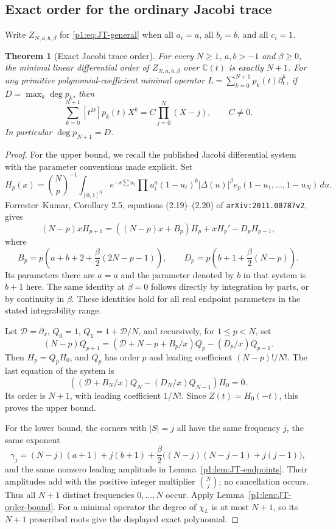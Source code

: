 \documentclass[11pt,a4paper]{article}
\newtheorem{theorem}{Theorem}[section]
\theoremstyle{definition}
\theoremstyle{remark}
\numberwithin{equation}{section}
\begin{document}
\subsection{Exact order for the ordinary Jacobi trace}

Write $Z_{N,a,b,\beta}$ for \eqref{p1:eq:JT-general} when all $a_i=a$,
all $b_i=b$, and all $c_i=1$.

\begin{theorem}[Exact Jacobi trace order]\label{p1:thm:JT-symmetric}
For every $N\ge1$, $a,b>-1$ and $\beta\ge0$, the minimal linear
differential order of $Z_{N,a,b,\beta}$ over $\mathbb C(t)$ is exactly
$N+1$.  For any primitive polynomial-coefficient minimal operator
$L=\sum_{k=0}^{N+1}p_k(t)\partial_t^k$, if
$D=\max_k\deg p_k$, then
\[
 \sum_{k=0}^{N+1}[t^D]p_k(t)X^k
       =C\prod_{j=0}^{N}(X-j),\qquad C\ne0.
\]
In particular $\deg p_{N+1}=D$.
\end{theorem}

\begin{proof}
For the upper bound, we recall the published Jacobi differential
system with the parameter conventions made explicit.  Set
\[
 H_p(x)=\binom Np^{-1}\int_{[0,1]^N}e^{-x\sum u_i}
  \prod u_i^a(1-u_i)^b |\Delta(u)|^\beta
  e_p(1-u_1,\ldots,1-u_N)\,du.
\]
Forrester--Kumar, Corollary 2.5, equations (2.19)--(2.20) of
\texttt{arXiv:2011.00787v2}, gives
\[
 (N-p)xH_{p+1}=((N-p)x+B_p)H_p+xH_p'-D_pH_{p-1},
\]
where
\[
 B_p=p\left(a+b+2+\frac\beta2(2N-p-1)\right),\qquad
 D_p=p\left(b+1+\frac\beta2(N-p)\right).
\]
Its parameters there are $a=a$ and the parameter denoted by $b$
in that system is $b+1$ here.  The same identity at $\beta=0$
follows directly by integration by parts, or by continuity in
$\beta$.  These identities hold for all real endpoint parameters
in the stated integrability range.

Let $\mathscr D=\partial_x$, $Q_0=1$, $Q_1=1+\mathscr D/N$, and
recursively, for $1\le p<N$, set
\[
 (N-p)Q_{p+1}
 =\left(\mathscr D+N-p+B_p/x\right)Q_p-(D_p/x)Q_{p-1}.
\]
Then $H_p=Q_pH_0$, and $Q_p$ has order $p$ and leading coefficient
$(N-p)!/N!$.  The last equation of the system is
\[
 \left((\mathscr D+B_N/x)Q_N-(D_N/x)Q_{N-1}\right)H_0=0.
\]
Its order is $N+1$, with leading coefficient $1/N!$.
Since $Z(t)=H_0(-t)$, this proves the upper bound.

For the lower bound, the corners with $|S|=j$ all have the same
frequency $j$, the same exponent
\[
 \gamma_j=(N-j)(a+1)+j(b+1)
   +\frac\beta2\big((N-j)(N-j-1)+j(j-1)\big),
\]
and the same nonzero leading amplitude in
Lemma~\ref{p1:lem:JT-endpoints}.  Their amplitudes add with the positive
integer multiplier $\binom Nj$; no cancellation occurs.  Thus all
$N+1$ distinct frequencies $0,\ldots,N$ occur.  Apply
Lemma~\ref{p1:lem:JT-order-bound}.  For a minimal operator the degree
of $\chi_L$ is at most $N+1$, so its $N+1$ prescribed roots give
the displayed exact polynomial.
\end{proof}
\end{document}
